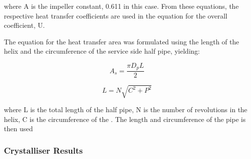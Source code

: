 where A is the impeller constant, 0.611 in this case. From these equations, the respective heat transfer coefficients are used in the equation for the overall coefficient, U.



The equation for the heat transfer area was formulated using the length of the helix and the circumference of the service side half pipe, yielding:

\begin{equation} \label{eq:coolantpipesa}
    A_s = \frac{\pi D_p L}{2}
    \end{equation}
    
\begin{equation}\label{eq:helixlength}
    L = N \sqrt{C^2 + P^2}
\end{equation}

where L is the total length of the half pipe, N is the number of revolutions in the helix, C is the circumference of the . The length and circumference of the pipe is then used


\subsubsection{Crystalliser Results}









